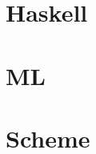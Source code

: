 \documentclass[12pt]{article}
\begin{document}
\section{Haskell}



\section{ML}



\section{Scheme}



\end{document}
